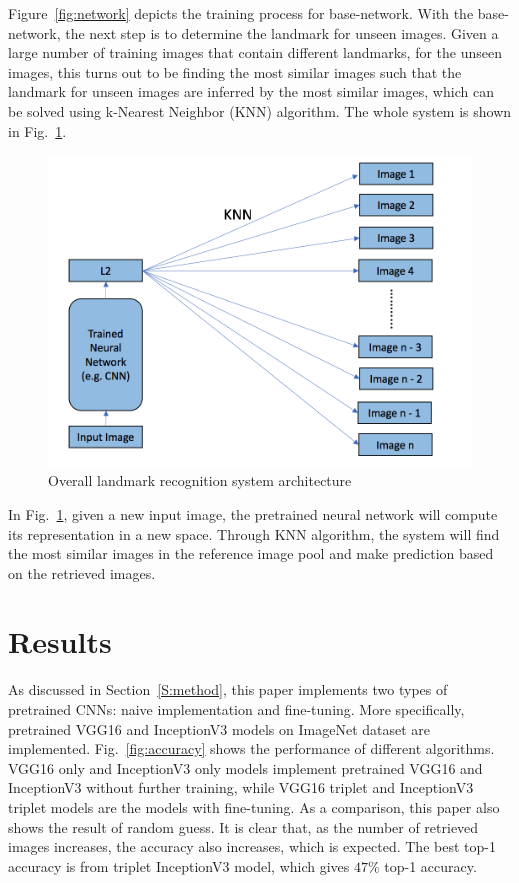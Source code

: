 \documentclass[final,3p]{elsarticle}
\begin{document}
Figure~\ref{fig:network} depicts the training process for base-network. With the base-network, the next step is to determine the landmark for unseen images. Given a large number of training images that contain different landmarks, for the unseen images, this turns out to be finding the most similar images such that the landmark for unseen images are inferred by the most similar images, which can be solved using k-Nearest Neighbor (KNN) algorithm. The whole system is shown in Fig.~\ref{fig:system}.

\begin{figure}[hbtp]
\centering\includegraphics[width=0.8\linewidth]{./figures/system.png}
\caption{Overall landmark recognition system architecture}
\label{fig:system}
\end{figure}

In Fig.~\ref{fig:system}, given a new input image, the pretrained neural network will compute its representation in a new space. Through KNN algorithm, the system will find the most similar images in the reference image pool and make prediction based on the retrieved images.

\section{Results}
\label{S:result}

As discussed in Section~\ref{S:method}, this paper implements two types of pretrained CNNs: naive implementation and fine-tuning. More specifically, pretrained VGG16 and InceptionV3 models on ImageNet dataset are implemented. Fig.~\ref{fig:accuracy} shows the performance of different algorithms. VGG16 only and InceptionV3 only models implement pretrained VGG16 and InceptionV3 without further training, while VGG16 triplet and InceptionV3 triplet models are the models with fine-tuning. As a comparison, this paper also shows the result of random guess. It is clear that, as the number of retrieved images increases, the accuracy also increases, which is expected. The best top-1 accuracy is from triplet InceptionV3 model, which gives $47\%$ top-1 accuracy.
\end{document}
